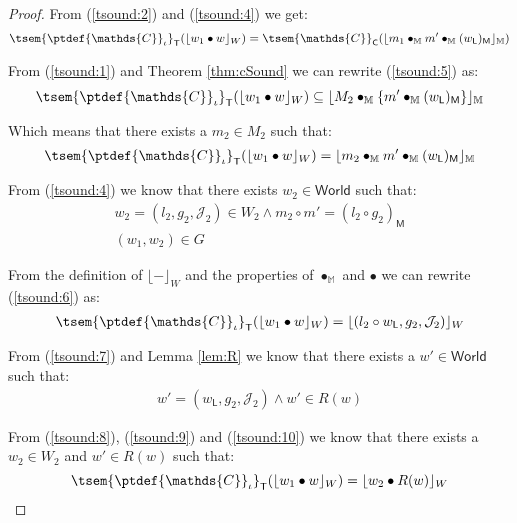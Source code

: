 {\begin{proof}
From (\ref{tsound:2}) and (\ref{tsound:4}) we get:
\begin{gather}\label{tsound:5}
\tsem{\ptdef{\mathds{C}}_\iota}_\mathsf{T}(\lfloor w_1 \bullet w \rfloor_W) =
\tsem{\mathds{C}}_\mathsf{C}(\lfloor m_1 \bullet_\mathbb{M} m' \bullet_\mathbb{M} (w_\mathsf{L})_\mathsf{M} \rfloor_\mathbb{M})
\end{gather}

From (\ref{tsound:1}) and Theorem \ref{thm:cSound} we can rewrite (\ref{tsound:5}) as:
\[
	\tsem{\ptdef{\mathds{C}}_\iota}_\mathsf{T}(\lfloor w_1 \bullet w \rfloor_W)
	\subseteq
	\lfloor M_2 \bullet_\mathbb{M} \{m' \bullet_\mathbb{M} (w_\mathsf{L})_\mathsf{M}\} \rfloor_\mathbb{M}
\]

Which means that there exists a $m_2 \in M_2$ such that:
\begin{gather}\label{tsound:6}
	\tsem{\ptdef{\mathds{C}}_\iota}_\mathsf{T}(\lfloor w_1 \bullet w \rfloor_W)
	=
	\lfloor m_2 \bullet_\mathbb{M} m' \bullet_\mathbb{M} (w_\mathsf{L})_\mathsf{M} \rfloor_\mathbb{M}
\end{gather}

From (\ref{tsound:4}) we know that there exists $w_2 \in \mathsf{World}$ such that:
\begin{gather}
\label{tsound:8} w_2 = (l_2, g_2, \mathcal{J}_2) \in W_2 \land m_2 \circ m' = (l_2 \circ g_2)_\mathsf{M} \\
\label{tsound:7} (w_1, w_2) \in G
\end{gather}

From the definition of $\lfloor - \rfloor_W$ and the properties of $\bullet_\mathbb{M}$ and $\bullet$ we can rewrite (\ref{tsound:6}) as:
\begin{gather}\label{tsound:9}
	\tsem{\ptdef{\mathds{C}}_\iota}_\mathsf{T}(\lfloor w_1 \bullet w \rfloor_W)
	=
	\lfloor (l_2 \circ w_\mathsf{L}, g_2, \mathcal{J}_2) \rfloor_W
\end{gather}

From (\ref{tsound:7}) and Lemma \ref{lem:R} we know that there exists a $w' \in \mathsf{World}$ such that:
\begin{gather}\label{tsound:10}
	w' = (w_\mathsf{L}, g_2, \mathcal{J}_2) \land w' \in R(w)
\end{gather}

From (\ref{tsound:8}), (\ref{tsound:9}) and (\ref{tsound:10}) we know that there exists a $w_2 \in W_2$ and $w' \in R(w)$ such that:
\[
	\tsem{\ptdef{\mathds{C}}_\iota}_\mathsf{T}(\lfloor w_1 \bullet w \rfloor_W) = \lfloor w_2 \bullet R(w) \rfloor_W
\]
\end{proof}
}

